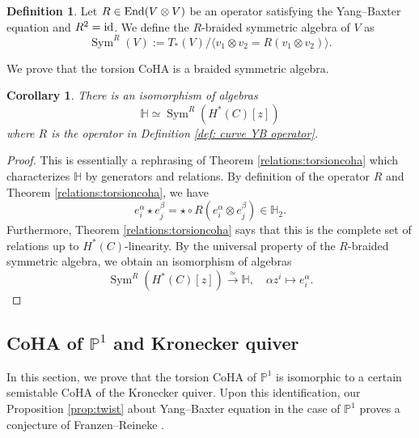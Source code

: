 \documentclass[10pt]{amsart}
\newcommand{\BP}{\mathbb{P}}
\newcommand{\BH}{\mathbb{H}}
\newcommand{\End}{\textnormal{End}}
\newcommand{\id}{\textnormal{id}}
\newcommand{\+}{{}^+}
\DeclareMathOperator{\Sym}{Sym}
\newtheorem {corollary}[theorem]{Corollary}
\theoremstyle{definition}
\theoremstyle {definition}
\theoremstyle {definition}
\newtheorem{definition}[theorem]{Definition}
\begin{document}
\begin{definition}
Let $R\in \End(V\otimes V)$ be an operator satisfying the Yang--Baxter equation and $R^2=\id$. We define the $R$-braided symmetric algebra of $V$ as 
$$\Sym^R(V):=T_*(V)/\langle v_1\otimes v_2=R(v_1\otimes v_2)\rangle. 
$$
\end{definition}

We prove that the torsion CoHA is a braided symmetric algebra. 

\begin{corollary}\label{cor: YB-twisted symmetric}
    There is an isomorphism of algebras 
\[ \mathbb{H} \simeq \Sym^{R}(H^{*}(C)[z])   \]
where $R$ is the operator in Definition \ref{def: curve YB operator}. 
\end{corollary}

\begin{proof}
This is essentially a rephrasing of Theorem \ref{relations:torsioncoha} which characterizes $\BH$ by generators and relations. By definition of the operator $R$ and Theorem \ref{relations:torsioncoha}, we have 
$$e_i^\alpha \star e^\beta_j= \star\circ R(e^\alpha_i\otimes e^\beta_j)\in \BH_2.
$$
Furthermore, Theorem \ref{relations:torsioncoha} says that this is the complete set of relations up to $H^*(C)$-linearity. By the universal property of the $R$-braided symmetric algebra, we obtain an isomorphism of algebras
$$\Sym^R(H^*(C)[z])\xrightarrow{\simeq} \BH,\quad \alpha z^i\mapsto e_i^\alpha. 
$$
\end{proof}


\subsection{CoHA of $\mathbb{P}^{1}$ and Kronecker quiver}\label{sec: Kronecker}

In this section, we prove that the torsion CoHA of $\BP^1$ is isomorphic to a certain semistable CoHA of the Kronecker quiver. Upon this identification, our Proposition \ref{prop:twist} about Yang--Baxter equation in the case of $\BP^1$ proves a conjecture of Franzen--Reineke \cite[Conj. 5]{franzen2019cohomological}. 
\end{document}
